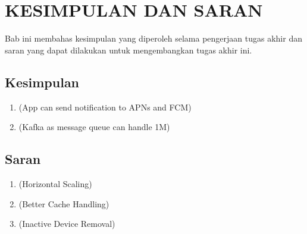 \chapter{KESIMPULAN DAN SARAN}
\par Bab ini membahas kesimpulan yang diperoleh selama pengerjaan tugas akhir dan saran yang dapat dilakukan untuk mengembangkan tugas akhir ini.

\section{Kesimpulan}
\begin{enumerate}
    \item (App can send notification to APNs and FCM) %
    \item (Kafka as message queue can handle 1M) %
\end{enumerate}

\section{Saran}
\begin{enumerate}
    \item (Horizontal Scaling) %
    \item (Better Cache Handling) %
    \item (Inactive Device Removal) %
\end{enumerate}
